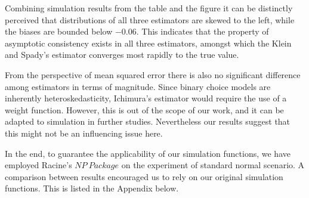 \documentclass[a4paper]{article}
\begin{document}
Combining simulation results from the table and the figure it can be distinctly perceived that distributions of all three estimators are skewed to the left, while the biases are bounded below $-0.06$. This indicates that the property of asymptotic consistency exists in all three estimators, amongst which the Klein and Spady's estimator converges most rapidly to the true value. 

From the perspective of mean squared error there is also no significant difference among estimators in terms of magnitude. Since binary choice models are inherently heteroskedasticity, Ichimura’s estimator would require the use of a weight function. However,  this is out of the scope of our work, and it can be adapted to simulation in further studies. Nevertheless our results suggest that this might not be an influencing issue here. 

In the end, to guarantee the applicability of our simulation functions, we have employed Racine's $NP\ Package$ on the experiment of standard normal scenario. A comparison between results encouraged us to rely on our original simulation functions. This is listed in the Appendix below. 
\end{document}
